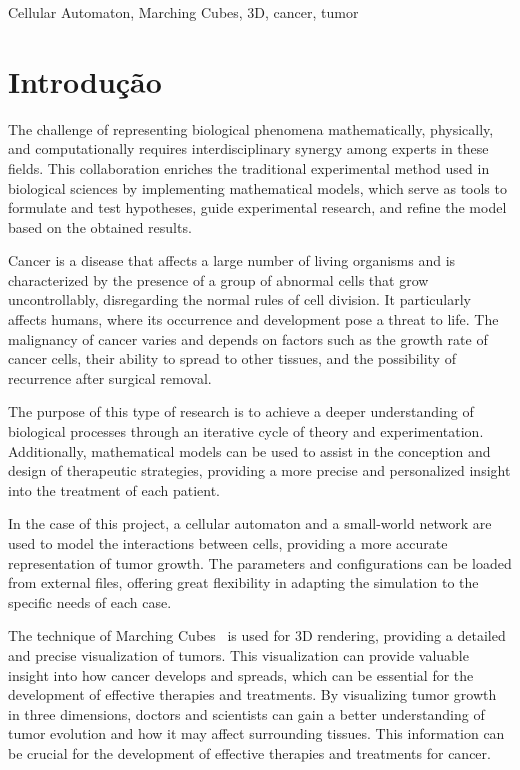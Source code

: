 \documentclass[a4paper,11pt]{article}
\begin{document}
{{\vskip 0.2cm  %


{\small{ %
 Cellular Automaton, Marching Cubes, 3D, cancer, tumor
}}
}


\section*{Introdução}

The challenge of representing biological phenomena mathematically, physically, and computationally requires interdisciplinary synergy among experts in these fields. This collaboration enriches the traditional experimental method used in biological sciences by implementing mathematical models, which serve as tools to formulate and test hypotheses, guide experimental research, and refine the model based on the obtained results.~\cite{7}

Cancer is a disease that affects a large number of living organisms and is characterized by the presence of a group of abnormal cells that grow uncontrollably, disregarding the normal rules of cell division. It particularly affects humans, where its occurrence and development pose a threat to life. The malignancy of cancer varies and depends on factors such as the growth rate of cancer cells, their ability to spread to other tissues, and the possibility of recurrence after surgical removal.

The purpose of this type of research is to achieve a deeper understanding of biological processes through an iterative cycle of theory and experimentation. Additionally, mathematical models can be used to assist in the conception and design of therapeutic strategies, providing a more precise and personalized insight into the treatment of each patient.

In the case of this project, a cellular automaton and a small-world network are used to model the interactions between cells, providing a more accurate representation of tumor growth. The parameters and configurations can be loaded from external files, offering great flexibility in adapting the simulation to the specific needs of each case.

The technique of Marching Cubes~\cite{5} is used for 3D rendering, providing a detailed and precise visualization of tumors. This visualization can provide valuable insight into how cancer develops and spreads, which can be essential for the development of effective therapies and treatments. By visualizing tumor growth in three dimensions, doctors and scientists can gain a better understanding of tumor evolution and how it may affect surrounding tissues. This information can be crucial for the development of effective therapies and treatments for cancer.


}
\end{document}
